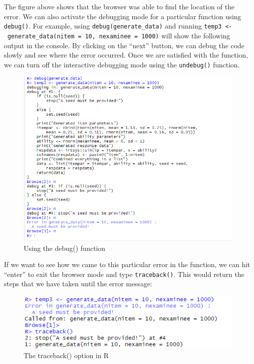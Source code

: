 \documentclass[
]{book}
\begin{document}
The figure above shows that the browser was able to find the location of the error. We can also activate the debugging mode for a particular function using \texttt{debug()}. For example, using \texttt{debug(generate\_data)} and running \texttt{temp3\ \textless{}-\ generate\_data(nitem\ =\ 10,\ nexaminee\ =\ 1000)} will show the following output in the console. By clicking on the ``next'' button, we can debug the code slowly and see where the error occurred. Once we are satisfied with the function, we can turn off the interactive debugging mode using the \texttt{undebug()} function.

\begin{figure}
\centering
\includegraphics{figure/debug5.png}
\caption{Using the debug() function}
\end{figure}

If we want to see how we came to this particular error in the function, we can hit ``enter'' to exit the browser mode and type \texttt{traceback()}. This would return the steps that we have taken until the error message:

\begin{figure}
\centering
\includegraphics{figure/debug2.png}
\caption{The traceback() option in R}
\end{figure}
\end{document}
